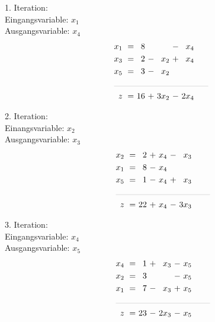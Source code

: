 \documentclass [a4paper,11pt]{article}
\begin{document}
\begin{enumerate}
\begin{enumerate}
\begin{enumerate}
                        1. Iteration:\\
                        Eingangsvariable: $x_1$\\
                        Ausgangsvariable: $x_4$
                        \begin{align*}
                        \begin{alignedat}{6}
                        && x_1 &\ = &\  8 &    &       &\ - &\  x_4 \\
                        && x_3 &\ = &\  2 &\ - &\  x_2 &\ + &\  x_4 \\
                        && x_5 &\ = &\  3 &\ - &\  x_2 & & \\
                        &\rlap{\rule{4cm}{.1pt}} &&&&&&&\\
                        && z   &\ = &\ 16 &\ + &\ 3x_2 &\ - &\ 2x_4
                        \end{alignedat}
                        \end{align*}

                        2. Iteration:\\
                        Einangsvariable: $x_2$\\
                        Ausgangsvariable: $x_3$
                        \begin{align*}
                        \begin{alignedat}{6}
                        && x_2 &\ = &\  2 &\ + &\  x_4 &\ - &\  x_3 \\
                        && x_1 &\ = &\  8 &\ - &\  x_4 &    & \\
                        && x_5 &\ = &\  1 &\ - &\  x_4 &\ + &\  x_3 \\
                        &\rlap{\rule{4cm}{.1pt}} &&&&&&&\\
                        && z   &\ = &\ 22 &\ + &\  x_4 &\ - &\ 3x_3
                        \end{alignedat}
                        \end{align*}

                        3. Iteration:\\
                        Eingangsvariable: $x_4$\\
                        Ausgangsvariable: $x_5$
                        \begin{align*}
                        \begin{alignedat}{6}
                        && x_4 &\ = &\  1 &\ + &\  x_3 &\ - &\  x_5 \\
                        && x_2 &\ = &\  3 &    &       &\ - &\  x_5 \\
                        && x_1 &\ = &\  7 &\ - &\  x_3 &\ + &\  x_5 \\
                        &\rlap{\rule{4cm}{.1pt}} &&&&&&&\\
                        && z   &\ = &\ 23 &\ - &\ 2x_3 &\ - &\  x_5
                        \end{alignedat}
                        \end{align*}


\end{enumerate}
\end{enumerate}
\end{enumerate}
\end{document}
